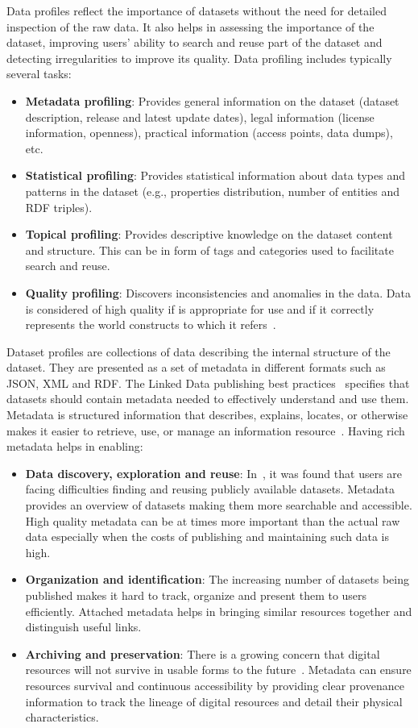 Data profiles reflect the importance of datasets without the need for detailed inspection of the raw data.  It also helps in assessing the importance of the dataset, improving users' ability to search and reuse part of the dataset and detecting irregularities to improve its quality. Data profiling includes typically several tasks:
\begin{itemize}
  \item \textbf{Metadata profiling}: Provides general information on the dataset (dataset description, release and latest update dates), legal information (license information, openness), practical information (access points, data dumps), etc.
  \item \textbf{Statistical profiling}: Provides statistical information about data types and patterns in the dataset (e.g., properties distribution, number of entities and RDF triples).
  \item \textbf{Topical profiling}: Provides descriptive knowledge on the dataset content and structure. This can be in form of tags and categories used to facilitate search and reuse.
  \item \textbf{Quality profiling}: Discovers inconsistencies and anomalies in the data. Data is considered of high quality if is appropriate for use and if it correctly represents the world constructs to which it refers~\cite{Juran:McGraw:99}.
\end{itemize}

Dataset profiles are collections of data describing the internal structure of the dataset. They are presented as a set of metadata in different formats such as JSON, XML and RDF. The Linked Data publishing best practices~\cite{Bizer:DB:11} specifies that datasets should contain metadata needed to effectively understand and use them. Metadata is structured information that describes, explains, locates, or otherwise makes it easier to retrieve, use, or manage an information resource~\cite{NISO:TechReport:04}. Having rich metadata helps in enabling:
\begin{itemize}
  \item \textbf{Data discovery, exploration and reuse}: In~\cite{Graham:TechReport:11}, it was found that users are facing difficulties finding and reusing publicly available datasets. Metadata provides an overview of datasets making them more searchable and accessible. High quality metadata can be at times more important than the actual raw data especially when the costs of publishing and maintaining such data is high.
  \item \textbf{Organization and identification}: The increasing number of datasets being published makes it hard to track, organize and present them to users efficiently. Attached metadata helps in bringing similar resources together and distinguish useful links.
  \item \textbf{Archiving and preservation}: There is a growing concern that digital resources will not survive in usable forms to the future~\cite{NISO:TechReport:04}. Metadata can ensure resources survival and continuous accessibility by providing clear provenance information to track the lineage of digital resources and detail their physical characteristics.
\end{itemize}

